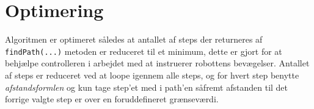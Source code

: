 \section{Optimering}
Algoritmen er optimeret således at antallet af steps der returneres af \texttt{findPath(...)} metoden er reduceret til et minimum, dette er gjort for at behjælpe controlleren i arbejdet med at instruerer robottens bevægelser. Antallet af steps er reduceret ved at loope igennem alle steps, og for hvert step benytte \textit{afstandsformlen} og kun tage step'et med i path'en såfremt afstanden til det forrige valgte step er over en foruddefineret grænseværdi.
